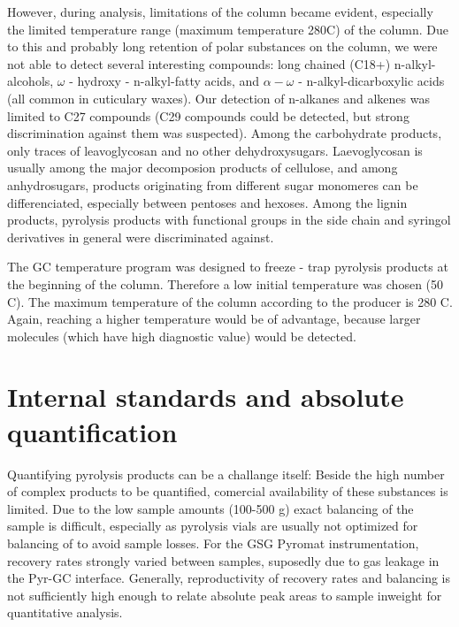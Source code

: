 However, during analysis, limitations of the column became evident, especially the limited temperature range (maximum temperature 280\textdegree C) of the column. Due to this and probably long retention of polar substances on the column, we were not able to detect several interesting compounds: long chained (C18+) n-alkyl-alcohols, $\omega$ - hydroxy - n-alkyl-fatty acids, and $\alpha - \omega$ - n-alkyl-dicarboxylic acids (all common in cuticulary waxes). Our detection of n-alkanes and alkenes was limited to C27 compounds (C29 compounds could be detected, but strong discrimination against them was suspected). Among the carbohydrate products, only traces of leavoglycosan and no other dehydroxysugars. Laevoglycosan is usually among the major decomposion products of cellulose, and among anhydrosugars, products originating from different sugar monomeres can be differenciated, especially between pentoses and hexoses. 
Among the lignin products, pyrolysis products with functional groups in the side chain and syringol derivatives in general were discriminated against. 

The GC temperature program was designed to freeze - trap pyrolysis products at the beginning of the column. Therefore a low initial temperature was chosen (50 \textdegree C). The maximum temperature of the column according to the producer is 280 \textdegree C. Again, reaching a higher temperature would be of advantage, because larger molecules (which have high diagnostic value) would be detected.

\section{Internal standards and absolute quantification}

Quantifying pyrolysis products can be a challange itself: Beside the high number of complex products to be quantified, comercial availability of these substances is limited. Due to the low sample amounts (100-500 \textmu g) exact balancing of the sample is difficult, especially as pyrolysis vials are usually not optimized for balancing of to avoid sample losses. For the GSG Pyromat instrumentation, recovery rates strongly varied between samples, suposedly due to gas leakage in the Pyr-GC interface. Generally, reproductivity of recovery rates and balancing is not sufficiently high enough to relate absolute peak areas to sample inweight for quantitative analysis. 

